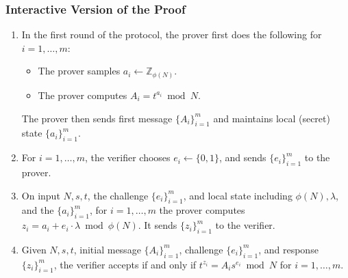 \documentclass[11pt]{article}
\newcommand{\Z}{\mathbb{Z}}
\newcommand{\?}[1]{\stackrel{?}{#1}}
\begin{document}
\subsubsection{Interactive Version of the Proof}
\begin{enumerate} 
  \item In the first round of the protocol, the prover first does the following for $i =1, \ldots, m$:
    \begin{itemize}
      \item The prover samples $a_i \gets \Z_{\phi(N)}$.
      \item The prover computes $A_i = t^{a_i} \bmod N$.
    \end{itemize}
The prover then sends first message $\{A_i\}_{i=1}^m$ and maintains local (secret) state $\{a_i\}_{i=1}^m$.

  \item For $i=1, \ldots, m$, the verifier chooses $e_i \leftarrow \{0,1\}$, and sends $\{e_i\}_{i=1}^m$ to the prover.

  \item On input $N, s, t$, the challenge $\{e_i\}_{i=1}^m$, and local state including $\phi(N), \lambda$, and the $\{a_i\}_{i=1}^m$, for $i=1, \ldots, m$ the prover computes $z_i= a_i + e_i \cdot \lambda \bmod \phi(N)$. It sends $\{z_i\}_{i=1}^m$ to the verifier.

  \item Given $N, s, t$, initial message $\{A_i\}_{i=1}^m$, challenge $\{e_i\}_{i=1}^m$, and response $\{z_i\}_{i=1}^m$, the verifier accepts if and only if 
$t^{z_i} = A_i s^{e_i} \bmod N$ for $i=1, \ldots, m$. 
\end{enumerate}
\end{document}
